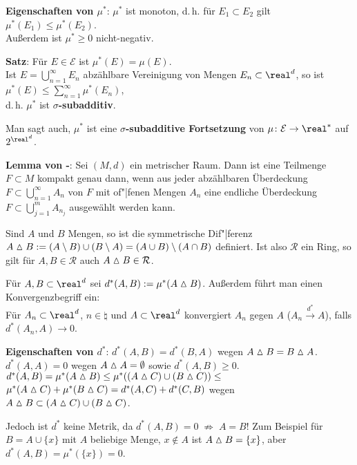 \textbf{Eigenschaften von $\mu^\ast$}:
$\mu^\ast$ ist monoton, d.\,h. für $E_1 \subset E_2$ gilt
$\mu^\ast(E_1) \le \mu^\ast(E_2)$. \\
Außerdem ist $\mu^\ast \ge 0$ nicht-negativ.

\textbf{Satz}:
Für $E \in \mathcal{E}$ ist $\mu^\ast(E) = \mu(E)$. \\
Ist $E = \bigcup_{n=1}^\infty E_n$ abzählbare Vereinigung von Mengen
$E_n \subset \real^d$, so ist
$\mu^\ast(E) \le \sum_{n=1}^\infty \mu^\ast(E_n)$, \\
d.\,h. $\mu^\ast$ ist \textbf{$\sigma$-subadditiv}.

Man sagt auch, $\mu^\ast$ ist eine
\textbf{$\sigma$-subadditive Fortsetzung} von
$\mu\colon \mathcal{E} \rightarrow \real^\ast$ auf $2^{\real^d}$.

\textbf{Lemma von -}:
Sei $(M, d)$ ein metrischer Raum. 
Dann ist eine Teilmenge $F \subset M$ kompakt genau dann, wenn aus jeder
abzählbaren Überdeckung $F \subset \bigcup_{n=1}^\infty A_n$ von $F$
mit of"|fenen Mengen $A_n$ eine endliche Überdeckung
$F \subset \bigcup_{j=1}^m A_{n_j}$ ausgewählt werden kann.

\linie
\pagebreak

Sind $A$ und $B$ Mengen, so ist die symmetrische Dif"|ferenz
$A \vartriangle B := (A \setminus B) \cup (B \setminus A) =
(A \cup B) \setminus (A \cap B)$ definiert.
Ist also $\mathcal{R}$ ein Ring, so gilt für $A, B \in \mathcal{R}$ auch
$A \vartriangle B \in \mathcal{R}$.

Für $A, B \subset \real^d$ sei $d^\ast(A, B) := \mu^\ast(A \vartriangle B)$.
Außerdem führt man einen Konvergenzbegriff ein: \\
Für $A_n \subset \real^d$, $n \in \natural$ und $A \subset \real^d$ konvergiert
$A_n$ gegen $A$ ($A_n \xrightarrow{d^\ast} A$), falls $d^\ast(A_n, A) \to 0$.

\textbf{Eigenschaften von $d^\ast$}: 
$d^\ast(A, B) = d^\ast(B, A)$ wegen $A \vartriangle B = B \vartriangle A$. \\
$d^\ast(A, A) = 0$ wegen $A \vartriangle A = \emptyset$ sowie
$d^\ast(A, B) \ge 0$. \\
$d^\ast(A, B) = \mu^\ast(A \vartriangle B) \le
\mu^\ast((A \vartriangle C) \cup (B \vartriangle C)) \le$ \\
$\mu^\ast(A \vartriangle C) + \mu^\ast(B \vartriangle C) =
d^\ast(A, C) + d^\ast(C, B)$
wegen $A \vartriangle B \subset (A \vartriangle C) \cup (B \vartriangle C)$.

Jedoch ist $d^\ast$ keine Metrik, da
$d^\ast(A, B) = 0 \;\not\Rightarrow\; A = B$! \qquad
Zum Beispiel für $B = A \cup \{x\}$ mit $A$ beliebige Menge, $x \notin A$ ist
$A \vartriangle B = \{x\}$, aber $d^\ast(A, B) = \mu^\ast(\{x\}) = 0$.

